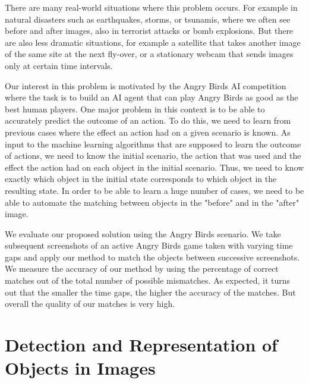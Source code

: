 \documentclass[letterpaper]{article}
\begin{document}
There are many real-world situations where this problem occurs. For example in natural disasters such as earthquakes, storms, or tsunamis, where we often see before and after images, also in terrorist attacks or bomb explosions. But there are also less dramatic situations, for example a satellite that takes another image of the same site at the next fly-over, or a stationary webcam that sends images only at certain time intervals. 

Our interest in this problem is motivated by the Angry Birds AI competition \cite{abCompetition} where the task is to build an AI agent that can play Angry Birds as good as the best human players. One major problem in this context is to be able to accurately predict the outcome of an action. To do this, we need to learn from previous cases where the effect an action had on a given scenario is known. As input to the machine learning algorithms that are supposed to learn the outcome of actions, we need to know the initial scenario, the action that was used and the effect the action had on each object in the initial scenario. Thus, we need to know exactly which object in the initial state corresponds to which object in the resulting state. In order to be able to learn a huge number of cases, we need to be able to automate the matching between objects in the "before" and in the "after" image.

We evaluate our proposed solution using the Angry Birds scenario. We take subsequent screenshots of an active Angry Birds game taken with varying time gaps and apply our method to match the objects between successive screenshots. We measure the accuracy of our method by using the percentage of correct matches out of the total number of possible mismatches. As expected, it turns out that the smaller the time gaps, the higher the accuracy of the matches. But overall the quality of our matches is very high. 



\section{Detection and Representation of Objects in Images}
\end{document}
